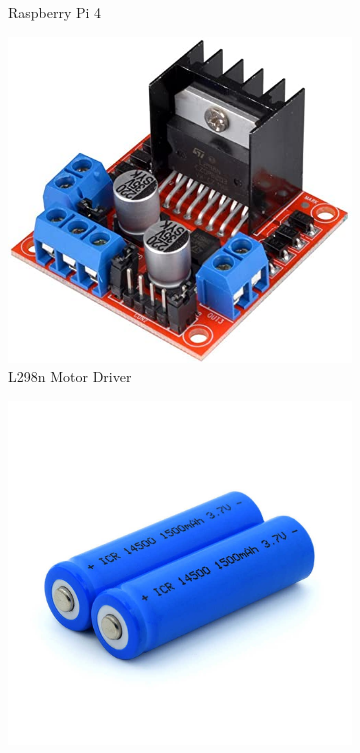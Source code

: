 \documentclass[12pt,a4paper]{article}
\begin{document}
\begin{large}
\begin{figure}[hb]
\begin{subfigure}{0.2\textwidth}
    \caption{Raspberry Pi 4}
    \label{fig:right}
    \end{subfigure}
  \begin{subfigure}{0.2\textwidth}
    \centering
    \includegraphics[width = \textwidth]{images/bridge.jpg}
    \caption{L298n Motor Driver}
    \label{fig:right}
    \end{subfigure}
  \begin{subfigure}{0.2\textwidth}
    \centering
    \includegraphics[width = \textwidth]{images/batterie.jpg}

\end{subfigure}
\end{figure}
\end{large}
\end{document}
